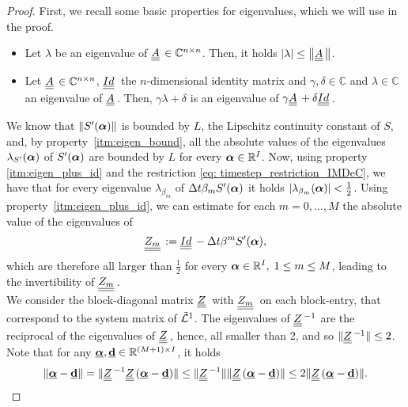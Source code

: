 \begin{proof}
	First, we recall some basic properties for eigenvalues, which we will use in the proof.
	\begin{itemize}	
		\item[\namedlabel{itm:eigen_bound}{i)}] 	Let $\lambda$ be an eigenvalue of $\mat{A}\in \mathbb{C}^{n\times n}$. Then, it holds
		$\lvert \lambda \rvert \le \norm{\mat{A}}$.
		\item[\namedlabel{itm:eigen_plus_id}{ii)}] Let $\mat{A}\in\mathbb{C}^{n\times n}$, $\mat{Id}$ the $n$-dimensional identity matrix and $\gamma, \delta \in \mathbb{C}$ and $\lambda \in \mathbb C$ an eigenvalue of $\mat{A}$.
		Then, $\gamma \lambda+\delta$ is an eigenvalue of $\gamma  \mat{A}+\delta \mat{Id}$.
	\end{itemize}
	We know that  $\left\lVert S'(\boldsymbol{\alpha})\right\rVert$ is bounded by $L$, the Lipschitz continuity constant of $S$, and, by property~\ref{itm:eigen_bound}, all the absolute values of the eigenvalues $\lambda_{S'}(\boldsymbol{\alpha})$ of $S'(\boldsymbol{\alpha})$ are bounded by $L$ for every $\boldsymbol{\alpha}\in \mathbb{R}^{I}$. 
	Now, using property \ref{itm:eigen_plus_id} and the restriction \eqref{eq: timestep_restriction_IMDeC}, we have that for every eigenvalue $\lambda_{\beta_m}$ of $\Delta t \beta_mS'(\boldsymbol{\alpha})$ it holds $\lvert \lambda_{\beta_m}(\boldsymbol{\alpha})\rvert<\frac{1}{2}$.
	Using property~\ref{itm:eigen_plus_id}, we can estimate for each $m=0,\dots,M$ the absolute value of the eigenvalues  of 
	\begin{equation*}
	\mat{Z_m}:=\mat{Id}-\Delta t \beta^m S'(\bc),
	\end{equation*}
	which are therefore all larger than $\frac{1}{2}$ for every $\boldsymbol{\alpha} \in \mathbb{R}^{I}, \; 1\le m  \le M$, leading to the invertibility of $\mat{Z_m}$. \\
	We consider the block-diagonal matrix $\mat{Z}$ with $\mat{Z_m}$ on each block-entry, that correspond to the system matrix of $\tilde{\mathcal L}^1$.
	The eigenvalues of $\mat{Z}^{-1}$ are the reciprocal of the eigenvalues of $\mat{Z}$, hence, all smaller than 2, and so $\lVert \mat{Z}^{-1}\rVert \leq 2$. Note that for any $\underline{\boldsymbol{\alpha}}, \underline{\mathbf{d}} \in \mathbb{R}^{(M+1)\times I}$, it holds
	\begin{align}
	\label{eq: dec_coercivity_conclusion}
		\lVert \bbc -\bbd  \rVert = \lVert \mat{Z}^{-1} \mat{Z}(\bbc -\bbd ) \rVert \leq  \lVert \mat{Z}^{-1}\rVert \lVert \mat{Z}(\bbc -\bbd ) \rVert \leq 2 \lVert \mat{Z}(\bbc -\bbd ) \rVert.

\end{align}
\end{proof}
